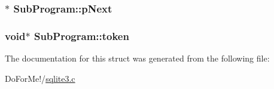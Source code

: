 \hypertarget{struct_sub_program_a7da35488ac58a64fa30b88da56aac8b3}{
\subsubsection[{p\-Next}]{$\ast$ Sub\-Program\-::p\-Next}}\label{struct_sub_program_a7da35488ac58a64fa30b88da56aac8b3}
\hypertarget{struct_sub_program_aaea3b67899b092476b107d22a4e2022d}{
\subsubsection[{token}]{\setlength{\rightskip}{0pt plus 5cm}void$\ast$ Sub\-Program\-::token}}\label{struct_sub_program_aaea3b67899b092476b107d22a4e2022d}


The documentation for this struct was generated from the following file\-:\begin{DoxyCompactItemize}
\item 
Do\-For\-Me!/\hyperlink{sqlite3_8c}{sqlite3.\-c}\end{DoxyCompactItemize}
